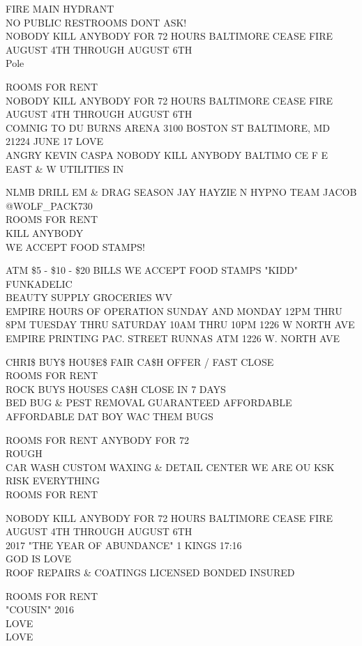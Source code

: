 \documentclass[10pt,letterpaper]{article}
\begin{document}
FIRE MAIN HYDRANT\\
NO PUBLIC RESTROOMS DONT ASK!\\
NOBODY KILL ANYBODY FOR 72 HOURS BALTIMORE CEASE FIRE AUGUST 4TH THROUGH AUGUST 6TH\\
Pole

ROOMS FOR RENT\\
NOBODY KILL ANYBODY FOR 72 HOURS BALTIMORE CEASE FIRE AUGUST 4TH THROUGH AUGUST 6TH\\
COMNIG TO DU BURNS ARENA 3100 BOSTON ST BALTIMORE, MD 21224 JUNE 17 LOVE\\
ANGRY KEVIN CASPA NOBODY KILL ANYBODY BALTIMO CE F E EAST \& W UTILITIES IN

NLMB DRILL EM \& DRAG SEASON JAY HAYZIE N HYPNO TEAM JACOB @WOLF\_PACK730\\
ROOMS FOR RENT\\
KILL ANYBODY\\
WE ACCEPT FOOD STAMPS!

ATM \$5 {-} \$10 {-} \$20 BILLS WE ACCEPT FOOD STAMPS "KIDD" FUNKADELIC\\
BEAUTY SUPPLY GROCERIES WV\\
EMPIRE HOURS OF OPERATION SUNDAY AND MONDAY 12PM THRU 8PM TUESDAY THRU SATURDAY 10AM THRU 10PM 1226 W NORTH AVE\\
EMPIRE PRINTING PAC. STREET RUNNAS ATM 1226 W. NORTH AVE

CHRI\$ BUY\$ HOU\$E\$ FAIR CA\$H OFFER / FAST CLOSE\\
ROOMS FOR RENT\\
ROCK BUYS HOUSES CA\$H CLOSE IN 7 DAYS\\
BED BUG \& PEST REMOVAL GUARANTEED AFFORDABLE AFFORDABLE DAT BOY WAC THEM BUGS

ROOMS FOR RENT ANYBODY FOR 72\\
ROUGH\\
CAR WASH CUSTOM WAXING \& DETAIL CENTER WE ARE OU KSK RISK EVERYTHING\\
ROOMS FOR RENT

NOBODY KILL ANYBODY FOR 72 HOURS BALTIMORE CEASE FIRE AUGUST 4TH THROUGH AUGUST 6TH\\
2017 "THE YEAR OF ABUNDANCE" 1 KINGS 17:16\\
GOD IS LOVE\\
ROOF REPAIRS \& COATINGS LICENSED BONDED INSURED

ROOMS FOR RENT\\
"COUSIN" 2016\\
LOVE\\
LOVE
\end{document}
